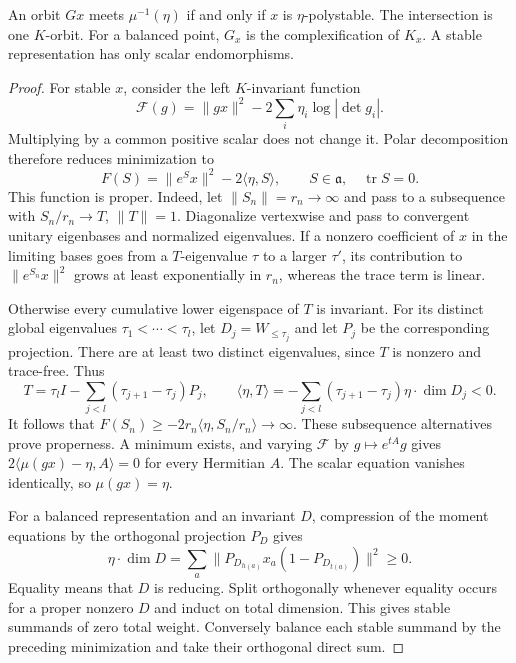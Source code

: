 \begin{proposition}\label{prop:real-polystability}
An orbit $Gx$ meets $\mu^{-1}(\eta)$ if and only if $x$ is
$\eta$-polystable. The intersection is one $K$-orbit.
For a balanced point, $G_x$ is the complexification of $K_x$.
A stable representation has only scalar endomorphisms.
\end{proposition}
\begin{proof}
For stable $x$, consider the left $K$-invariant function
\[
 \mathcal F(g)=\|gx\|^2-2\sum_i\eta_i\log|\det g_i|.
\]
Multiplying by a common positive scalar does not change it.
Polar decomposition therefore reduces minimization to
\[
 F(S)=\|e^Sx\|^2-2\langle\eta,S\rangle,\qquad
 S\in\mathfrak a,\quad \operatorname{tr}S=0.
\]
This function is proper. Indeed, let $\|S_n\|=r_n\to\infty$ and
pass to a subsequence with $S_n/r_n\to T$, $\|T\|=1$.
Diagonalize vertexwise and pass to convergent unitary eigenbases and
normalized eigenvalues. If a nonzero coefficient of $x$ in the limiting
bases goes from a $T$-eigenvalue $\tau$ to a larger $\tau'$, its
contribution to $\|e^{S_n}x\|^2$ grows at least exponentially in $r_n$,
whereas the trace term is linear.

Otherwise every cumulative lower eigenspace of $T$ is invariant.
For its distinct global eigenvalues $\tau_1<\cdots<\tau_l$, let
$D_j=W_{\le\tau_j}$ and let $P_j$ be the corresponding projection.
There are at least two distinct eigenvalues, since $T$ is nonzero
and trace-free. Thus
\[
 T=\tau_l I-\sum_{j<l}(\tau_{j+1}-\tau_j)P_j,\qquad
 \langle\eta,T\rangle
 =-\sum_{j<l}(\tau_{j+1}-\tau_j)\eta\cdot\dim D_j<0.
\]
It follows that $F(S_n)\ge-2r_n\langle\eta,S_n/r_n\rangle\to\infty$.
These subsequence alternatives prove properness. A minimum exists,
and varying $\mathcal F$ by $g\mapsto e^{tA}g$ gives
$2\langle\mu(gx)-\eta,A\rangle=0$ for every Hermitian $A$.
The scalar equation vanishes identically, so $\mu(gx)=\eta$.

For a balanced representation and an invariant $D$, compression of the
moment equations by the orthogonal projection $P_D$ gives
\begin{equation}\label{eq:subrepresentation-trace}
 \eta\cdot\dim D
 =\sum_a\|P_{D_{h(a)}}x_a(1-P_{D_{t(a)}})\|^2\ge0.
\end{equation}
Equality means that $D$ is reducing. Split orthogonally whenever
equality occurs for a proper nonzero $D$ and induct on total dimension.
This gives stable summands of zero total weight. Conversely balance
each stable summand by the preceding minimization and take their
orthogonal direct sum.


\end{proof}
